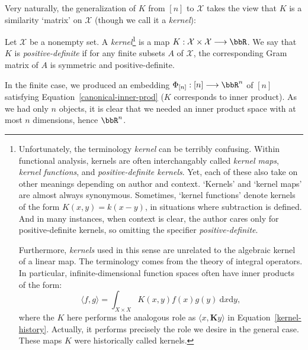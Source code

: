 \documentclass[twoside,11pt]{homework}
\renewcommand{\to}{\longrightarrow}
\begin{document}
\begin{multicols}{2}
Very naturally, the generalization of $K$ from $[n]$ to $\mathcal{X}$ takes the view that $K$ is a similarity `matrix' on $\mathcal{X}$ (though we call it a \emph{kernel}):
\begin{definition} Let $\mathcal{X}$ be a nonempty set. A \emph{kernel}\footnote{Unfortunately, the terminology \emph{kernel} can be terribly confusing. Within functional analysis, kernels are often interchangably called \emph{kernel maps}, \emph{kernel functions}, and \emph{positive-definite kernels}. Yet, each of these also take on other meanings depending on author and context. `Kernels' and `kernel maps' are almost always synonymous. Sometimes, `kernel functions' denote kernels of the form $K(x,y) = k(x-y)$, in situations where subtraction is defined. And in many instances, when context is clear, the author cares only for positive-definite kernels, so omitting the specifier \emph{positive-definite}.

    Furthermore, \emph{kernels} used in this sense are unrelated to the algebraic kernel of a linear map. The terminology comes from the theory of integral operators. In particular, infinite-dimensional function spaces often have inner products of the form:
    \[\langle f, g\rangle = \int_{X \times X} K(x,y) f(x) g(y) \ \mathrm{d}x \mathrm{d}y,\]
    where the $K$ here performs the analogous role as $\langle x, \mathbf{K}y\rangle$ in Equation~\ref{kernel-history}. Actually, it performs precisely the role we desire in the general case. These maps $K$ were historically called kernels.
  } is a map $K : \mathcal{X} \times \mathcal{X} \to \bbR$. We say that $K$ is \emph{positive-definite} if for any finite subsets $A$ of $\mathcal{X}$, the corresponding Gram matrix of $A$ is symmetric and positive-definite.
\end{definition}

In the finite case, we produced an embedding $\Phi_{[n]} : [n] \to \bbR^n$ of $[n]$ satisfying Equation~\ref{canonical-inner-prod} ($K$ corresponds to inner product). As we had only $n$ objects, it is clear that we needed an inner product space with at most $n$ dimensions, hence $\bbR^n$.


\end{multicols}
\end{document}
